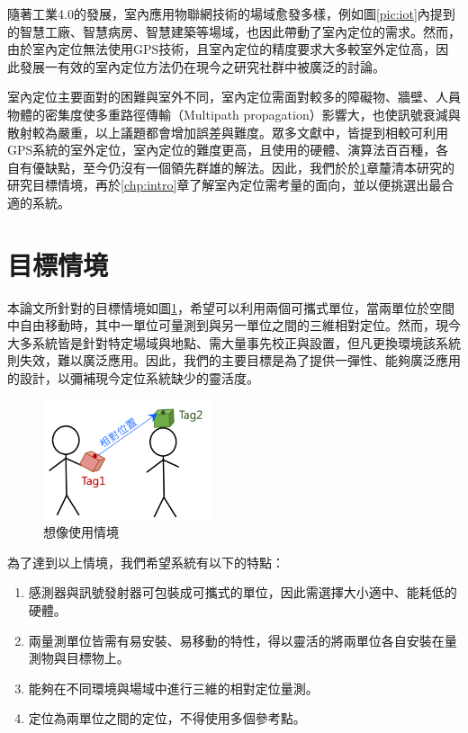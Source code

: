 隨著工業4.0的發展，室內應用物聯網技術的場域愈發多樣，例如圖\ref{pic:iot}內提到的智慧工廠、智慧病房、智慧建築等場域，也因此帶動了室內定位的需求。然而，由於室內定位無法使用GPS技術，且室內定位的精度要求大多較室外定位高，因此發展一有效的室內定位方法仍在現今之研究社群中被廣泛的討論\cite{survey_indoor2014}。

室內定位主要面對的困難與室外不同，室內定位需面對較多的障礙物、牆壁、人員物體的密集度使多重路徑傳輸（Multipath propagation）影響大，也使訊號衰減與散射較為嚴重，以上議題都會增加誤差與難度。眾多文獻中，\cite{survey_light2020}\cite{survey_light2018}\cite{survey_indoor2014}\cite{survey_indoor2018}\cite{survey:indoor_wayfinding}皆提到相較可利用GPS系統的室外定位，室內定位的難度更高，且使用的硬體、演算法百百種，各自有優缺點，至今仍沒有一個領先群雄的解法。因此，我們於於\ref{chp:motivate}章釐清本研究的研究目標情境，再於\ref{chp:intro}章了解室內定位需考量的面向，並以便挑選出最合適的系統。






\section{目標情境}
\label{chp:motivate}

本論文所針對的目標情境如圖\ref{pic:imagine}，希望可以利用兩個可攜式單位，當兩單位於空間中自由移動時，其中一單位可量測到與另一單位之間的三維相對定位。然而，現今大多系統皆是針對特定場域與地點、需大量事先校正與設置，但凡更換環境該系統則失效，難以廣泛應用。因此，我們的主要目標是為了提供一彈性、能夠廣泛應用的設計，以彌補現今定位系統缺少的靈活度。

\begin{figure}[ht]
    \centering
    \includegraphics[width=5cm]{ch1pic/imagine.png}
    \caption{想像使用情境}
    \label{pic:imagine}
\end{figure}

為了達到以上情境，我們希望系統有以下的特點：

\begin{enumerate}
    \item 感測器與訊號發射器可包裝成可攜式的單位，因此需選擇大小適中、能耗低的硬體。
    \item 兩量測單位皆需有易安裝、易移動的特性，得以靈活的將兩單位各自安裝在量測物與目標物上。
    \item 能夠在不同環境與場域中進行三維的相對定位量測。
    \item 定位為兩單位之間的定位，不得使用多個參考點。
\end{enumerate}




